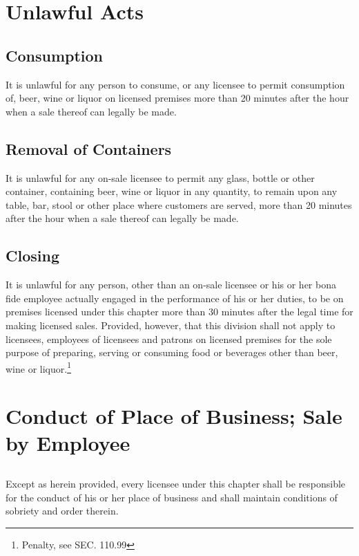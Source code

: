 
\setcounter{section}{39}
\section{Unlawful Acts}
\subsection{Consumption}
It is unlawful for any person to consume, or any licensee to permit consumption of, beer, wine or liquor on licensed premises more than 20 minutes after the hour when a sale thereof can legally be made.
\subsection{Removal of Containers}
It is unlawful for any on-sale licensee to permit any glass, bottle or other container, containing beer, wine or liquor in any quantity, to remain upon any table, bar, stool or other place where customers are served, more than 20 minutes after the hour when a sale thereof can legally be made.
\subsection{Closing}
It is unlawful for any person, other than an on-sale licensee or his or her bona fide employee actually engaged in the performance of his or her duties, to be on premises licensed under this chapter more than 30 minutes after the legal time for making licensed sales.  Provided, however, that this division shall not apply to licensees, employees of licensees and patrons on licensed premises for the sole purpose of preparing, serving or consuming food or beverages other than beer, wine or liquor.\footnote{Penalty, see SEC. 110.99}

\section{Conduct of Place of Business; Sale by Employee}
\subsection{}
Except as herein provided, every licensee under this chapter shall be responsible for the conduct of his or her place of business and shall maintain conditions of sobriety and order therein.
